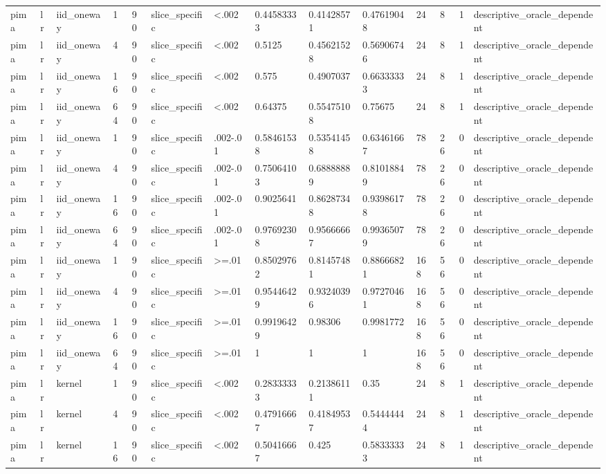 \begin{tabular}{llllllllllllll}
pima & lr & iid\_oneway & 1 & 90 & slice\_specific & <.002 & 0.44583333 & 0.41428571 & 0.47619048 & 24 & 8 & 1 & descriptive\_oracle\_dependent \\
pima & lr & iid\_oneway & 4 & 90 & slice\_specific & <.002 & 0.5125 & 0.45621528 & 0.56906746 & 24 & 8 & 1 & descriptive\_oracle\_dependent \\
pima & lr & iid\_oneway & 16 & 90 & slice\_specific & <.002 & 0.575 & 0.4907037 & 0.66333333 & 24 & 8 & 1 & descriptive\_oracle\_dependent \\
pima & lr & iid\_oneway & 64 & 90 & slice\_specific & <.002 & 0.64375 & 0.55475108 & 0.75675 & 24 & 8 & 1 & descriptive\_oracle\_dependent \\
pima & lr & iid\_oneway & 1 & 90 & slice\_specific & .002-.01 & 0.58461538 & 0.53541458 & 0.63461667 & 78 & 26 & 0 & descriptive\_oracle\_dependent \\
pima & lr & iid\_oneway & 4 & 90 & slice\_specific & .002-.01 & 0.75064103 & 0.68888889 & 0.81018849 & 78 & 26 & 0 & descriptive\_oracle\_dependent \\
pima & lr & iid\_oneway & 16 & 90 & slice\_specific & .002-.01 & 0.9025641 & 0.86287348 & 0.93986178 & 78 & 26 & 0 & descriptive\_oracle\_dependent \\
pima & lr & iid\_oneway & 64 & 90 & slice\_specific & .002-.01 & 0.97692308 & 0.95666667 & 0.99365079 & 78 & 26 & 0 & descriptive\_oracle\_dependent \\
pima & lr & iid\_oneway & 1 & 90 & slice\_specific & >=.01 & 0.85029762 & 0.81457481 & 0.88666821 & 168 & 56 & 0 & descriptive\_oracle\_dependent \\
pima & lr & iid\_oneway & 4 & 90 & slice\_specific & >=.01 & 0.95446429 & 0.93240396 & 0.97270461 & 168 & 56 & 0 & descriptive\_oracle\_dependent \\
pima & lr & iid\_oneway & 16 & 90 & slice\_specific & >=.01 & 0.99196429 & 0.98306 & 0.9981772 & 168 & 56 & 0 & descriptive\_oracle\_dependent \\
pima & lr & iid\_oneway & 64 & 90 & slice\_specific & >=.01 & 1 & 1 & 1 & 168 & 56 & 0 & descriptive\_oracle\_dependent \\
pima & lr & kernel & 1 & 90 & slice\_specific & <.002 & 0.28333333 & 0.21386111 & 0.35 & 24 & 8 & 1 & descriptive\_oracle\_dependent \\
pima & lr & kernel & 4 & 90 & slice\_specific & <.002 & 0.47916667 & 0.41849537 & 0.54444444 & 24 & 8 & 1 & descriptive\_oracle\_dependent \\
pima & lr & kernel & 16 & 90 & slice\_specific & <.002 & 0.50416667 & 0.425 & 0.58333333 & 24 & 8 & 1 & descriptive\_oracle\_dependent \\

\end{tabular}
